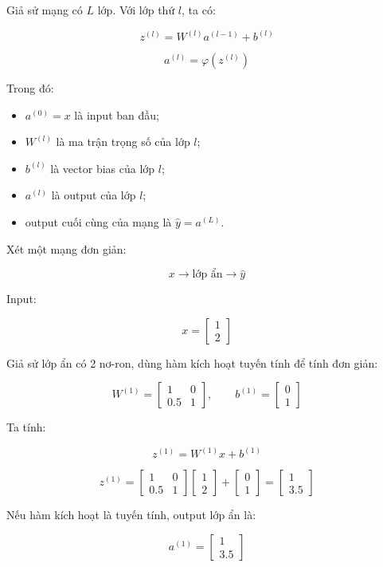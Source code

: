 Giả sử mạng có $L$ lớp. Với lớp thứ $l$, ta có:

\[
    z^{(l)} = W^{(l)}a^{(l-1)} + b^{(l)}
\]

\[
    a^{(l)} = \varphi \left(z^{(l)}\right)
\]

Trong đó:

\begin{itemize}
    \item $a^{(0)} = x$ là input ban đầu;
    \item $W^{(l)}$ là ma trận trọng số của lớp $l$;
    \item $b^{(l)}$ là vector bias của lớp $l$;
    \item $a^{(l)}$ là output của lớp $l$;
    \item output cuối cùng của mạng là $\hat{y}=a^{(L)}$.
\end{itemize}

\begin{vidu}
Xét một mạng đơn giản:

\[
    x \rightarrow \text{lớp ẩn} \rightarrow \hat{y}
\]

Input:

\[
    x = 
    \begin{bmatrix}
    1\\
    2
    \end{bmatrix}
\]

Giả sử lớp ẩn có 2 nơ-ron, dùng hàm kích hoạt tuyến tính để tính đơn giản:

\[
    W^{(1)}=
    \begin{bmatrix}
    1 & 0\\
    0.5 & 1
    \end{bmatrix},
    \qquad
    b^{(1)}=
    \begin{bmatrix}
    0\\
    1
    \end{bmatrix}
\]

Ta tính:

\[
    z^{(1)} = W^{(1)}x+b^{(1)}
\]

\[
    z^{(1)}
    =
    \begin{bmatrix}
    1 & 0\\
    0.5 & 1
    \end{bmatrix}
    \begin{bmatrix}
    1\\
    2
    \end{bmatrix}
    +
    \begin{bmatrix}
    0\\
    1
    \end{bmatrix}
    =
    \begin{bmatrix}
    1\\
    3.5
    \end{bmatrix}
\]

Nếu hàm kích hoạt là tuyến tính, output lớp ẩn là:

\[
    a^{(1)}=
    \begin{bmatrix}
    1\\
    3.5
    \end{bmatrix}
\]
\end{vidu}

